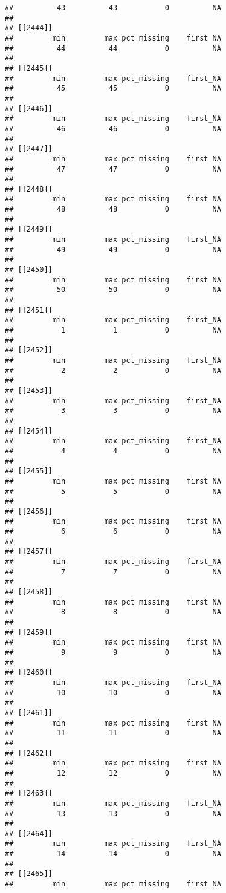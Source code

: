 \documentclass[
]{article}
\begin{document}
\begin{verbatim}
##          43          43           0          NA 
## 
## [[2444]]
##         min         max pct_missing    first_NA 
##          44          44           0          NA 
## 
## [[2445]]
##         min         max pct_missing    first_NA 
##          45          45           0          NA 
## 
## [[2446]]
##         min         max pct_missing    first_NA 
##          46          46           0          NA 
## 
## [[2447]]
##         min         max pct_missing    first_NA 
##          47          47           0          NA 
## 
## [[2448]]
##         min         max pct_missing    first_NA 
##          48          48           0          NA 
## 
## [[2449]]
##         min         max pct_missing    first_NA 
##          49          49           0          NA 
## 
## [[2450]]
##         min         max pct_missing    first_NA 
##          50          50           0          NA 
## 
## [[2451]]
##         min         max pct_missing    first_NA 
##           1           1           0          NA 
## 
## [[2452]]
##         min         max pct_missing    first_NA 
##           2           2           0          NA 
## 
## [[2453]]
##         min         max pct_missing    first_NA 
##           3           3           0          NA 
## 
## [[2454]]
##         min         max pct_missing    first_NA 
##           4           4           0          NA 
## 
## [[2455]]
##         min         max pct_missing    first_NA 
##           5           5           0          NA 
## 
## [[2456]]
##         min         max pct_missing    first_NA 
##           6           6           0          NA 
## 
## [[2457]]
##         min         max pct_missing    first_NA 
##           7           7           0          NA 
## 
## [[2458]]
##         min         max pct_missing    first_NA 
##           8           8           0          NA 
## 
## [[2459]]
##         min         max pct_missing    first_NA 
##           9           9           0          NA 
## 
## [[2460]]
##         min         max pct_missing    first_NA 
##          10          10           0          NA 
## 
## [[2461]]
##         min         max pct_missing    first_NA 
##          11          11           0          NA 
## 
## [[2462]]
##         min         max pct_missing    first_NA 
##          12          12           0          NA 
## 
## [[2463]]
##         min         max pct_missing    first_NA 
##          13          13           0          NA 
## 
## [[2464]]
##         min         max pct_missing    first_NA 
##          14          14           0          NA 
## 
## [[2465]]
##         min         max pct_missing    first_NA 

\end{verbatim}
\end{document}
